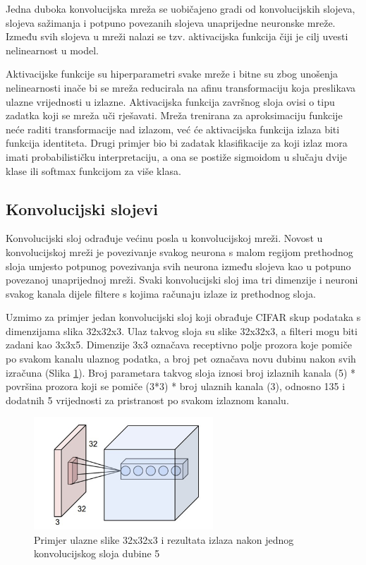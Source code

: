 \documentclass[times, utf8, proizvoljni, numeric]{fer}
\begin{document}
Jedna duboka konvolucijska mreža se uobičajeno gradi od konvolucijskih slojeva, slojeva sažimanja i potpuno povezanih slojeva unaprijedne neuronske mreže. Između svih slojeva u mreži nalazi se tzv. aktivacijska funkcija čiji je cilj uvesti nelinearnost u model.

Aktivacijske funkcije su hiperparametri svake mreže i bitne su zbog unošenja nelinearnosti inače bi se mreža reducirala na afinu transformaciju koja preslikava ulazne vrijednosti u izlazne. Aktivacijska funkcija završnog sloja ovisi o tipu zadatka koji se mreža uči rješavati. Mreža trenirana za aproksimaciju funkcije neće raditi transformacije nad izlazom, već će aktivacijska funkcija izlaza biti funkcija identiteta. Drugi primjer bio bi zadatak klasifikacije za koji izlaz mora imati probabilističku interpretaciju, a ona se postiže sigmoidom u slučaju dvije klase ili softmax funkcijom za više klasa. 


\subsection{Konvolucijski slojevi}

Konvolucijski sloj odrađuje većinu posla u konvolucijskoj mreži. Novost u konvolucijskoj mreži je povezivanje svakog neurona s malom regijom prethodnog sloja umjesto potpunog povezivanja svih neurona između slojeva kao u potpuno povezanoj unaprijednoj mreži. Svaki konvolucijski sloj ima tri dimenzije i neuroni svakog kanala dijele filtere s kojima računaju izlaze iz prethodnog sloja.

Uzmimo za primjer jedan konvolucijski sloj koji obrađuje CIFAR skup podataka s dimenzijama slika 32x32x3. Ulaz takvog sloja su slike 32x32x3, a filteri mogu biti zadani kao 3x3x5. Dimenzije 3x3 označava receptivno polje prozora koje pomiče po svakom kanalu ulaznog podatka, a broj pet označava novu dubinu nakon svih izračuna (Slika \ref{fg:konvolucijski_sloj}). Broj parametara takvog sloja iznosi broj izlaznih kanala (5) * površina prozora koji se pomiče (3*3) * broj ulaznih kanala (3), odnosno 135 i dodatnih 5 vrijednosti za pristranost po svakom izlaznom kanalu.

\begin{figure}[!ht]
	\begin{center}
		\captionsetup{justification=centering}
		\includegraphics[width=0.6\textwidth]{./imgs/konvolucijski_sloj.png}
		\caption{Primjer ulazne slike 32x32x3 i rezultata izlaza nakon jednog konvolucijskog sloja dubine 5 \cite{CS231n}}
		\label{fg:konvolucijski_sloj}
	\end{center}
\end{figure}
\end{document}
